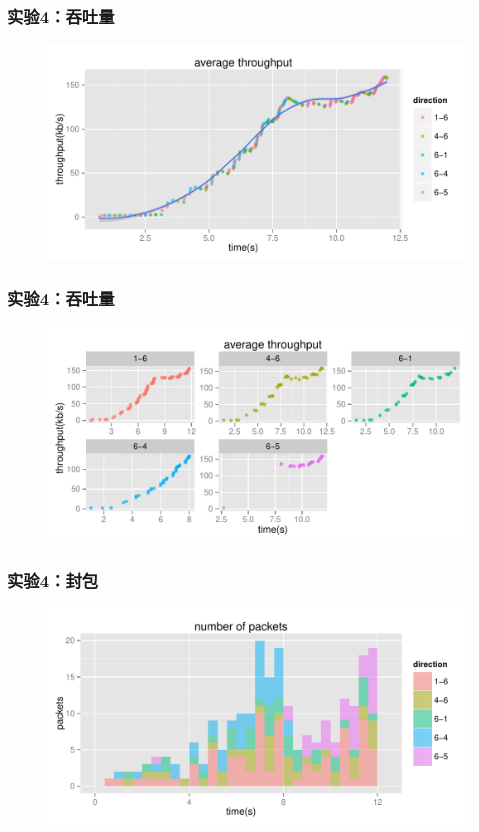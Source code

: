 \documentclass[xcolor={usenames,dvipsnames}]{beamer}
\begin{document}
\begin{frame}
	\frametitle{\textbf{实验}4：\textbf{吞吐量}}
	\begin{figure}
		\includegraphics[width=1.05\textwidth]{pic/plot_router_th_1.pdf}
	\end{figure}
\end{frame}

\begin{frame}
	\frametitle{\textbf{实验}4：\textbf{吞吐量}}
		\begin{figure}
			\includegraphics[width=1.05\textwidth]{pic/plot_router_th_2.pdf}
		\end{figure}
\end{frame}

\begin{frame}
	\frametitle{\textbf{实验}4：\textbf{封包}}
	\begin{figure}
		\includegraphics[width=1.05\textwidth]{pic/plot_router_fre.pdf}
	\end{figure}
\end{frame}
\end{document}
